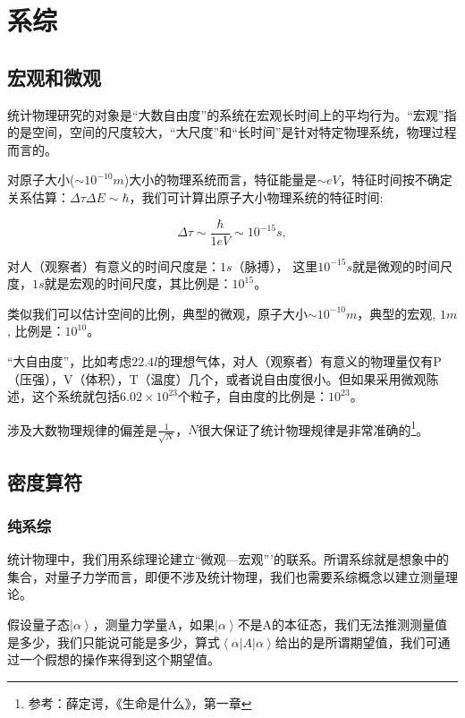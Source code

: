 \section{系综}

\subsection{宏观和微观}

统计物理研究的对象是“大数自由度”的系统在宏观长时间上的平均行为。“宏观”指的是空间，空间的尺度较大，“大尺度”和“长时间”是针对特定物理系统，物理过程而言的。

对原子大小($\sim 10^{-10}m$)大小的物理系统而言，特征能量是$\sim eV$，特征时间按不确定关系估算：$\Delta \tau \Delta E \sim \hbar$，我们可计算出原子大小物理系统的特征时间:

\begin{equation*}
\Delta \tau \sim \frac{\hbar}{1eV} \sim 10^{-15}s,
\end{equation*}

对人（观察者）有意义的时间尺度是：$1s$（脉搏）， 这里$10^{-15}s$就是微观的时间尺度，$1s$就是宏观的时间尺度，其比例是：$10^{15}$。

类似我们可以估计空间的比例，典型的微观，原子大小$\sim 10^{-10}m$，典型的宏观, $1m$, 比例是：$10^{10}$。

“大自由度”，比如考虑$22.4 l$的理想气体，对人（观察者）有意义的物理量仅有P（压强），V（体积），T（温度）几个，或者说自由度很小。但如果采用微观陈述，这个系统就包括$6.02 \times
10^{23}$个粒子，自由度的比例是：$10^{23}$。

涉及大数物理规律的偏差是$\frac{1}{\sqrt N}$，$N$很大保证了统计物理规律是非常准确的\footnote{参考：薛定谔，《生命是什么》，第一章}。



\subsection{密度算符}

\subsubsection{纯系综}

统计物理中，我们用系综理论建立“微观---宏观”'的联系。所谓系综就是想象中的集合，对量子力学而言，即便不涉及统计物理，我们也需要系综概念以建立测量理论。

假设量子态$\left| \alpha \right\rangle$，测量力学量A，如果$\left| \alpha \right\rangle$不是A的本征态，我们无法推测测量值是多少，我们只能说可能是多少，算式$\left\langle \alpha \right| A \left| \alpha \right\rangle$给出的是所谓期望值，我们可通过一个假想的操作来得到这个期望值。

